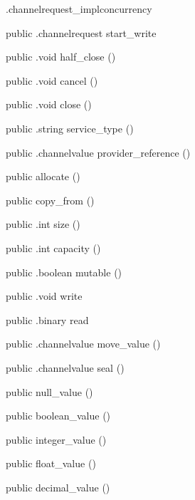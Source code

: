 \begin{CrexxClass}{.channelrequest\_impl}{concurrency}
\begin{Members}
    \Method
      {public}
      {.channelrequest}
      {start\_write}
      {}

    \Method
      {public}
      {.void}
      {half\_close}
      {()}

    \Method
      {public}
      {.void}
      {cancel}
      {()}

    \Method
      {public}
      {.void}
      {close}
      {()}

    \Method
      {public}
      {.string}
      {service\_type}
      {()}

    \Method
      {public}
      {.channelvalue}
      {provider\_reference}
      {()}

    \Factory
      {public}
      {allocate}
      {()}

    \Factory
      {public}
      {copy\_from}
      {()}

    \Method
      {public}
      {.int}
      {size}
      {()}

    \Method
      {public}
      {.int}
      {capacity}
      {()}

    \Method
      {public}
      {.boolean}
      {mutable}
      {()}

    \Method
      {public}
      {.void}
      {write}
      {}

    \Method
      {public}
      {.binary}
      {read}
      {}

    \Method
      {public}
      {.channelvalue}
      {move\_value}
      {()}

    \Method
      {public}
      {.channelvalue}
      {seal}
      {()}

    \Factory
      {public}
      {null\_value}
      {()}

    \Factory
      {public}
      {boolean\_value}
      {()}

    \Factory
      {public}
      {integer\_value}
      {()}

    \Factory
      {public}
      {float\_value}
      {()}

    \Factory
      {public}
      {decimal\_value}
      {()}


\end{Members}
\end{CrexxClass}
